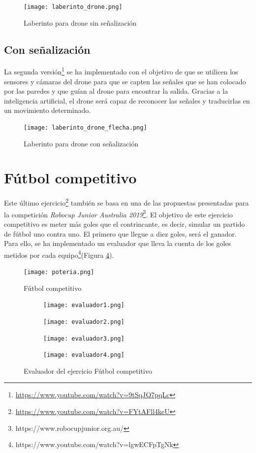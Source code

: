 \clearpage
\begin{figure}[h!]
    \centering
    \texttt{[image: laberinto\_drone.png]}
    \caption{Laberinto para drone sin señalización}
    \label{fig:Laberinto_drone}
\end{figure}


\subsection{Con señalización}
La segunda versión\footnote{\url{https://www.youtube.com/watch?v=9tSqJQ7pqLc}} se ha implementado con el objetivo de que se utilicen los sensores y cámaras del drone para que se capten las señales que se han colocado por las paredes y que guían al drone para encontrar la salida. Gracias a la inteligencia artificial, el drone será capaz de reconocer las señales y traducirlas en un movimiento determinado.

\begin{figure}[h!]
    \centering
    \texttt{[image: laberinto\_drone\_flecha.png]}
    \caption{Laberinto para drone con señalización}
    \label{fig:Laberinto_drone_señal}
\end{figure}

\section{Fútbol competitivo}
Este último ejercicio\footnote{\url{https://www.youtube.com/watch?v=FYtAFll4keU}} también se basa en una de las propuestas presentadas para la competición \textit{Robocup Junior Australia 2019}\footnote{https://www.robocupjunior.org.au/}. El objetivo de este ejercicio competitivo es meter más goles que el contrincante, es decir, simular un partido de fútbol uno contra uno. El primero que llegue a diez goles, será el ganador. Para ello, se ha implementado un evaluador que lleva la cuenta de los goles metidos por cada equipo\footnote{https://www.youtube.com/watch?v=lgwECFpTgNk}(Figura \ref{fig:evaluador}). 

\begin{figure}[h!]
    \centering
    \texttt{[image: poteria.png]}
    \caption{Fútbol competitivo}
    \label{fig:futbol}
\end{figure}

\begin{figure}[h!]
  \begin{subfigure}[b]{0.5\textwidth}
    \texttt{[image: evaluador1.png]}
  \end{subfigure}
  \hfill
  \hfill
  \begin{subfigure}[b]{0.5\textwidth}
    \texttt{[image: evaluador2.png]}
  \end{subfigure}
    \hfill
    \hfill
  \begin{subfigure}[b]{0.5\textwidth}
    \texttt{[image: evaluador3.png]}
  \end{subfigure}
    \hfill
  \begin{subfigure}[b]{0.5\textwidth}
    \texttt{[image: evaluador4.png]}
  \end{subfigure}
\caption{Evaluador del ejercicio Fútbol competitivo}
\label{fig:evaluador}
\end{figure}

